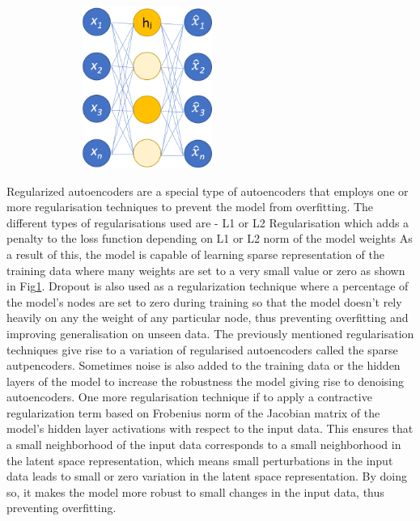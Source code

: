 {\begin{figure}
\begin{minipage}[t]{.45\textwidth}
      \label{fig:undercompleteautoencoder}
    \end{minipage}%
    \hspace{1cm}
    \begin{minipage}[t]{.45\textwidth}
      \centering
      \includegraphics[width=200pt,height=150pt]{pictures/sparse_autoencoder.png}
      \label{fig:sparse_autoencoder}
    \end{minipage}
\end{figure}
Regularized autoencoders are a special type of autoencoders that employs one or more regularisation techniques to prevent the model from overfitting. The different types of regularisations used are - L1 or L2 Regularisation which adds a penalty to the loss function depending on L1 or L2 norm of the model weights As a result of this, the model is capable of learning sparse representation of the training data where many weights are set to a very small value or zero as shown in Fig\ref*{fig:sparse_autoencoder}. Dropout is also used as a regularization technique where a percentage of the model's nodes are set to zero during training so that the model doesn't rely heavily on any the weight of any particular node, thus preventing overfitting and improving generalisation on unseen data. The previously mentioned regularisation techniques give rise to a variation of regularised autoencoders called the sparse autpencoders\cite*{ng2011sparse}. Sometimes noise is also added to the training data or the hidden layers of the model to increase the robustness the model giving rise to denoising autoencoders\cite*{vincent2008extracting}. One more regularisation technique if to apply a contractive regularization term based on Frobenius norm of the Jacobian matrix of the model's hidden layer activations with respect to the input data\cite*{rifai2011contractive,autoencoder}. This ensures that a small neighborhood of the input data corresponds to a small neighborhood in the latent space representation, which means small perturbations in the input data leads to small or zero variation in the latent space representation\cite*{rifai2011contractive,autoencoder}. By doing so, it makes the model more robust to small changes in the input data, thus preventing overfitting.\\
}
